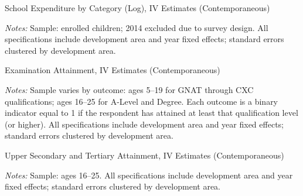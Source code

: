 \documentclass[12pt]{article}
\newcommand*{\TableContempPath}{../Paper_3_Tables/Main_Regression_Tables}
\begin{document}
	\begin{table}[H]
	\centering
	\begin{adjustbox}{max width=\linewidth, center}
	\begin{threeparttable}
		\caption{School Expenditure by Category (Log), IV Estimates (Contemporaneous)}
		\label{tab:expenditures_log_contemp}
		{\small}
		\begin{tablenotes}
			\small
			\item \textit{Notes:} Sample: enrolled children; 2014 excluded due to survey design. All specifications include development area and year fixed effects; standard errors clustered by development area.
		\end{tablenotes}
	\end{threeparttable}
	\end{adjustbox}
	\end{table}
	\begin{table}[H]
	\centering
	\begin{adjustbox}{max width=\linewidth, center}
	\begin{threeparttable}
		\caption{Examination Attainment, IV Estimates (Contemporaneous)}
		\label{tab:exams_contemp}
		{\small}
		\begin{tablenotes}
			\small
			\item \textit{Notes:} Sample varies by outcome: ages 5--19 for GNAT through CXC qualifications; ages 16--25 for A-Level and Degree. Each outcome is a binary indicator equal to 1 if the respondent has attained at least that qualification level (or higher). All specifications include development area and year fixed effects; standard errors clustered by development area.
		\end{tablenotes}
	\end{threeparttable}
	\end{adjustbox}
	\end{table}
	\begin{table}[H]
	\centering
	\begin{adjustbox}{max width=\linewidth, center}
	\begin{threeparttable}
		\caption{Upper Secondary and Tertiary Attainment, IV Estimates (Contemporaneous)}
		\label{tab:sixthform_contemp}
		{\small}
		\begin{tablenotes}
			\small
			\item \textit{Notes:} Sample: ages 16--25. All specifications include development area and year fixed effects; standard errors clustered by development area.
		\end{tablenotes}
	\end{threeparttable}
	\end{adjustbox}
	\end{table}
\end{document}

